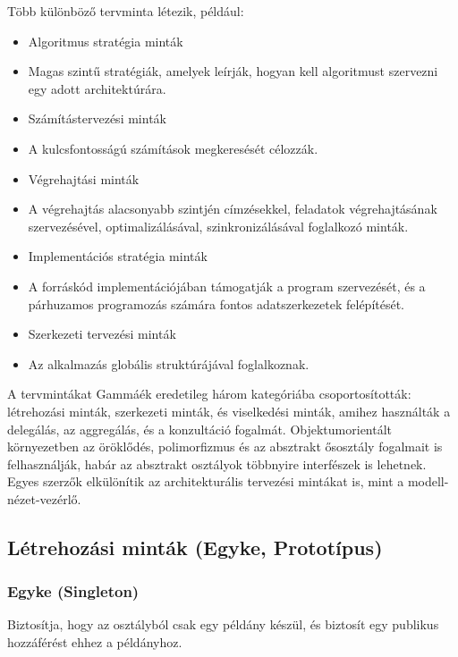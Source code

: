 \documentclass[margin=0px]{article}
\begin{document}
Több különböző tervminta létezik, például:
\begin{itemize}
    \item Algoritmus stratégia minták
    \item Magas szintű stratégiák, amelyek leírják, hogyan kell algoritmust szervezni egy adott architektúrára.
    \item Számítástervezési minták
    \item A kulcsfontosságú számítások megkeresését célozzák.
    \item Végrehajtási minták
    \item A végrehajtás alacsonyabb szintjén címzésekkel, feladatok végrehajtásának szervezésével, optimalizálásával, szinkronizálásával foglalkozó minták.
    \item Implementációs stratégia minták
    \item A forráskód implementációjában támogatják a program szervezését, és a párhuzamos programozás számára fontos adatszerkezetek felépítését.
    \item Szerkezeti tervezési minták
    \item Az alkalmazás globális struktúrájával foglalkoznak.
\end{itemize}

A tervmintákat Gammáék eredetileg három kategóriába csoportosították: létrehozási minták, szerkezeti minták, és viselkedési minták, amihez használták a delegálás, az aggregálás, és a konzultáció fogalmát. Objektumorientált környezetben az öröklődés, polimorfizmus és az absztrakt ősosztály fogalmait is felhasználják, habár az absztrakt osztályok többnyire interfészek is lehetnek. Egyes szerzők elkülönítik az architekturális tervezési mintákat is, mint a modell-nézet-vezérlő.

\subsection{Létrehozási minták (Egyke, Prototípus)}

\subsubsection{Egyke (Singleton)}
Biztosítja, hogy az osztályból csak egy példány készül, és biztosít egy publikus hozzáférést ehhez a példányhoz.
\end{document}
